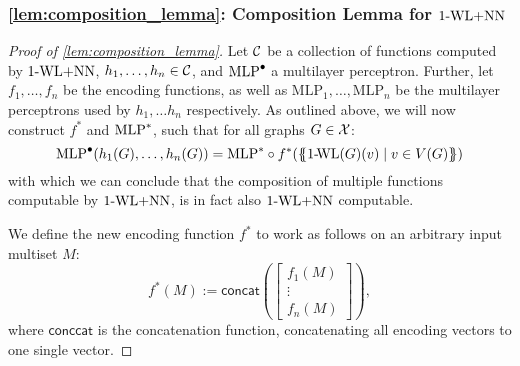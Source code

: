 \subsubsection{\cref{lem:composition_lemma}: Composition Lemma for $\text{1-WL+NN}$}
\begin{proof}[Proof of \cref{lem:composition_lemma}]
    Let $\mathcal{C}$ be a collection of functions computed by $\text{1-WL+NN}$, $h_1, \dots ,h_n \in \mathcal{C}$, and $\text{MLP}^\bullet$ a multilayer perceptron. Further, let $f_{1}, \ldots, f_{n}$ be the encoding functions, as well as $\text{MLP}_1, \ldots, \text{MLP}_n$ be the multilayer perceptrons used by $h_1, \dots h_n$ respectively. As outlined above, we will now construct $f^*$ and $\text{MLP}^*$, such that for all graphs $G \in \mathcal{X}$:
    \begin{equation*}
        \text{MLP}^\bullet(h_1(G), \dots ,h_n(G)) = \text{MLP}^* \circ f^* (\{\!\!\{ \text{1-\!WL}(G)(v) \mid v \in V(G) \}\!\!\})
    \end{equation*}
    with which we can conclude that the composition of multiple functions computable by $\text{1-WL+NN}$, is in fact also $\text{1-WL+NN}$ computable. 

    We define the new encoding function $f^*$ to work as follows on an arbitrary input multiset $M$:
    \begin{equation*}
        f^*(M) := \textsf{concat}(
            \begin{bmatrix}
                f_1(M)\\
                \vdots\\
                f_n(M)
            \end{bmatrix}),
    \end{equation*}
    where $\textsf{conccat}$ is the concatenation function, concatenating all encoding vectors to one single vector.


\end{proof}
